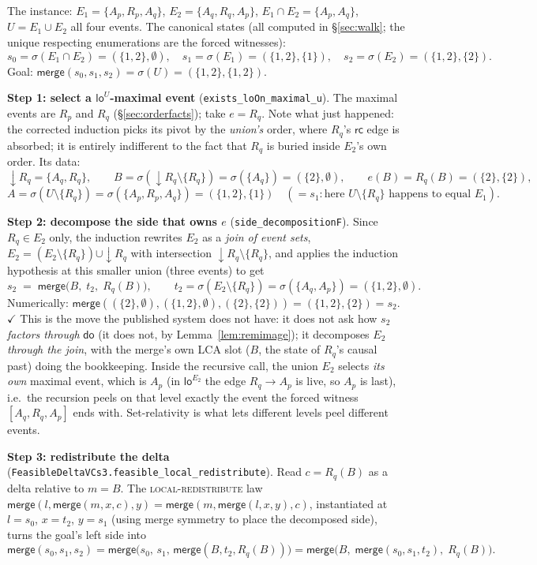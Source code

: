 \documentclass[11pt]{article}
\newcommand{\rcrel}{\mathsf{rc}}
\newcommand{\mergeL}{\mathsf{merge}}
\newcommand{\loE}[1]{\mathsf{lo}^{#1}}
\newcommand{\dow}[1]{{\downarrow}#1}
\newcommand{\lean}[1]{\texttt{#1}}
\newcommand{\Ap}{A_p}
\newcommand{\Aq}{A_q}
\newcommand{\Rp}{R_p}
\newcommand{\Rq}{R_q}
\begin{document}
The instance: $E_1 = \{\Ap,\Rp,\Aq\}$, $E_2 = \{\Aq,\Rq,\Ap\}$,
$E_1 \cap E_2 = \{\Ap,\Aq\}$, $U = E_1 \cup E_2$ all four events. The
canonical states (all computed in \S\ref{sec:walk}; the unique
respecting enumerations are the forced witnesses):
\[
  s_0 = \sigma(E_1 \cap E_2) = (\{1,2\},\emptyset), \quad
  s_1 = \sigma(E_1) = (\{1,2\},\{1\}), \quad
  s_2 = \sigma(E_2) = (\{1,2\},\{2\}).
\]
Goal: $\mergeL(s_0, s_1, s_2) = \sigma(U) = (\{1,2\},\{1,2\})$.

\textbf{Step 1: select a $\loE{U}$-maximal event}
(\lean{exists\_loOn\_maximal\_u}). The maximal events are $\Rp$ and
$\Rq$ (\S\ref{sec:orderfacts}); take $e = \Rq$. Note what just
happened: the corrected induction picks its pivot by the
\emph{union's} order, where $\Rq$'s $\rcrel$ edge is absorbed; it is
entirely indifferent to the fact that $\Rq$ is buried inside $E_2$'s
own order. Its data:
\[
  \dow{\Rq} = \{\Aq, \Rq\}, \qquad
  B = \sigma(\dow{\Rq} \setminus \{\Rq\}) = \sigma(\{\Aq\}) =
  (\{2\},\emptyset), \qquad
  e(B) = \Rq(B) = (\{2\},\{2\}),
\]
\[
  A = \sigma(U \setminus \{\Rq\}) = \sigma(\{\Ap,\Rp,\Aq\}) =
  (\{1,2\},\{1\}) \quad (= s_1: \text{here } U \setminus \{\Rq\}
  \text{ happens to equal } E_1).
\]

\textbf{Step 2: decompose the side that owns $e$}
(\lean{side\_decompositionF}). Since $\Rq \in E_2$ only, the induction
rewrites $E_2$ as a \emph{join of event sets},
$E_2 = (E_2 \setminus \{\Rq\}) \cup \dow{\Rq}$ with intersection
$\dow{\Rq} \setminus \{\Rq\}$, and applies the induction hypothesis at
this smaller union (three events) to get
\[
  s_2 \;=\; \mergeL\bigl(B,\; t_2,\; \Rq(B)\bigr),
  \qquad t_2 = \sigma(E_2 \setminus \{\Rq\}) = \sigma(\{\Aq,\Ap\}) =
  (\{1,2\},\emptyset).
\]
Numerically: $\mergeL((\{2\},\emptyset), (\{1,2\},\emptyset),
(\{2\},\{2\})) = (\{1,2\},\{2\}) = s_2$. $\checkmark$
This is the move the published system does not have: it does not ask
how $s_2$ \emph{factors through} $\mathsf{do}$ (it does not, by
Lemma~\ref{lem:remimage}); it decomposes $E_2$ \emph{through the
join}, with the merge's own LCA slot ($B$, the state of $\Rq$'s causal
past) doing the bookkeeping. Inside the recursive call, the union
$E_2$ selects \emph{its own} maximal event, which is $\Ap$ (in
$\loE{E_2}$ the edge $\Rq \to \Ap$ is live, so $\Ap$ is last), i.e.\
the recursion peels on that level exactly the event the forced witness
$[\Aq,\Rq,\Ap]$ ends with. Set-relativity is what lets different
levels peel different events.

\textbf{Step 3: redistribute the delta}
(\lean{FeasibleDeltaVCs3.feasible\_local\_redistribute}). Read
$c = \Rq(B)$ as a delta relative to $m = B$. The
\textsc{local-redistribute} law
$\mergeL(l, \mergeL(m, x, c), y) = \mergeL(m, \mergeL(l, x, y), c)$,
instantiated at $l = s_0$, $x = t_2$, $y = s_1$ (using merge symmetry
to place the decomposed side), turns the goal's left side into
\[
  \mergeL(s_0, s_1, s_2)
  = \mergeL\bigl(s_0,\, s_1,\, \mergeL(B, t_2, \Rq(B))\bigr)
  = \mergeL\bigl(B,\; \mergeL(s_0, s_1, t_2),\; \Rq(B)\bigr).
\]
\end{document}

